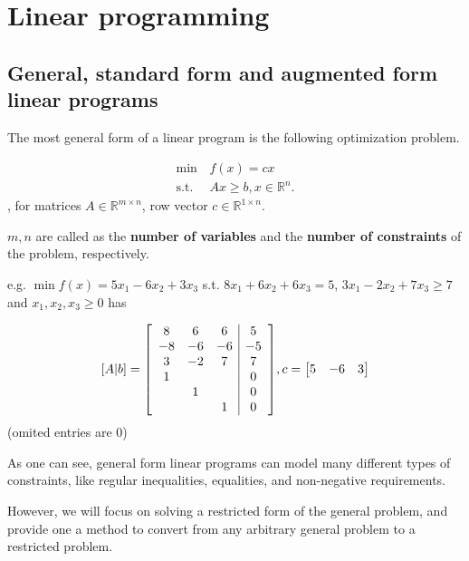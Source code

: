 \chapter{Linear programming} %
\label{sec:Linear programming}
\section{General, standard form and augmented form linear programs} %
\label{sec:General, standard form and augmented form linear programs}

The most general form of a linear program is the following optimization problem.

\begin{align*}
  \min\, &f(x) = cx\\
  \text{s.t.}\, & Ax\ge b, x \in \mathbb{R}^{n}
.\end{align*}, for matrices \( A \in \mathbb{R}^{m \times n}\), row vector
\(c \in \mathbb{R}^{ 1\times  n} \).

\( m, n \) are called as the \textbf{number of variables} and the \textbf{number
of constraints} of the problem, respectively.

e.g. $\min f(x)=5x_{1}-6x_{2}+3x_{3}$ s.t. $8x_{1}+6x_{2}+6x_{3}=5$, $3x_{1}-2x_{2}+7x_{3}\geq 7$ and $x_{1},x_{2},x_{3}\geq 0$ has

\renewcommand\arraystretch{1.3}

\[
  [A|b]=\mleft[
  \begin{array}{ccc|c}
8 & 6 & 6 & 5 \\
-8 & -6 & -6 & -5 \\
3 & -2 & 7 & 7 \\
1 &  &  & 0 \\
 & 1 &  & 0 \\
	 &  & 1 & 0 \\
   \end{array}
   \mright], c=\begin{bmatrix}
5 & -6 & 3
\end{bmatrix}
\] (omited entries are \( 0 \))

As one can see, general form linear programs can model many different types of
constraints, like regular inequalities, equalities, and non-negative
requirements.

However, we will focus on solving a restricted form of the general problem, and
provide one a method to convert from any arbitrary general problem to a
restricted problem.

